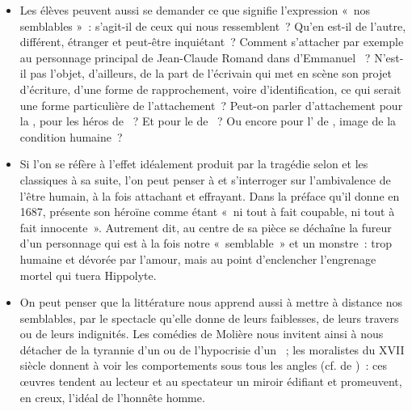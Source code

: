 {\begin{itemize}
œuvres littéraires qui ont découlé de ces bouleversements ( de Jean
de ,  ~;  de ~; fiction de …) reflètent ces
réalités historiques mais les dépassent souvent aussi en combattant les préjugés
ethnocentriques et raciaux qui ont eu cours, en promouvant la plus haute idée de
l'humain, quel que soit le peuple où il s'incarne.
\item  Les élèves peuvent aussi se demander ce que signifie l'expression «~nos semblables
»~: s'agit-il de ceux qui nous ressemblent~? Qu'en est-il de l'autre, différent, étranger et
peut-être inquiétant~? Comment s'attacher par exemple au personnage principal de
Jean-Claude Romand dans  d'Emmanuel ~? N'est-il pas l'objet,
d'ailleurs, de la part de l'écrivain qui met en scène son projet d'écriture, d'une forme
de rapprochement, voire d'identification, ce qui serait une forme particulière de
l'attachement~? Peut-on parler d'attachement pour la , pour
les héros de ~? Et pour le  de ~? Ou encore pour l'
de , image de la condition humaine~?
\item Si l'on se réfère à l'effet idéalement produit par la tragédie selon  et les
classiques à sa suite, l'on peut penser à  et s'interroger sur l'ambivalence de
l'être humain, à la fois attachant et effrayant. Dans la préface qu'il donne en 1687,
 présente son héroïne comme étant «~ni tout à fait coupable, ni tout à fait
innocente~». Autrement dit, au centre de sa pièce se déchaîne la fureur d'un personnage
qui est à la fois notre «~semblable~» et un monstre~: trop humaine et dévorée par
l'amour, mais au point d'enclencher l'engrenage mortel qui tuera Hippolyte.
\item  On peut penser que la littérature nous apprend aussi à mettre à distance nos
semblables, par le spectacle qu'elle donne de leurs faiblesses, de leurs travers ou de
leurs indignités. Les comédies de Molière nous invitent ainsi à nous détacher de la
tyrannie d'un  ou de l'hypocrisie d'un ~; les moralistes du XVII\ieme{} siècle
donnent à voir les comportements sous tous les angles (cf.  de )~: ces œuvres tendent au lecteur et au spectateur un miroir édifiant et
promeuvent, en creux, l'idéal de l'honnête homme.
\end{itemize}

}
